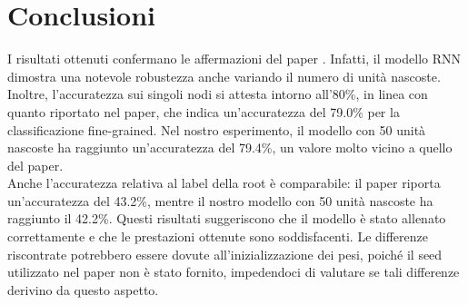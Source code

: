 \section{Conclusioni}

I risultati ottenuti confermano le affermazioni del paper
\cite{socher-etal-2013-recursive}. Infatti, il modello RNN dimostra una notevole
robustezza anche variando il numero di unità nascoste. Inoltre, l'accuratezza
sui singoli nodi si attesta intorno all'80\%, in linea con quanto riportato nel
paper, che indica un'accuratezza del 79.0\% per la classificazione fine-grained.
Nel nostro esperimento, il modello con 50 unità nascoste ha raggiunto
un'accuratezza del 79.4\%, un valore molto vicino a quello del paper.\\
Anche l'accuratezza relativa al label della root è comparabile: il paper riporta
un'accuratezza del 43.2\%, mentre il nostro modello con 50 unità nascoste ha
raggiunto il 42.2\%. Questi risultati suggeriscono che il modello è stato
allenato correttamente e che le prestazioni ottenute sono soddisfacenti. Le
differenze riscontrate potrebbero essere dovute all'inizializzazione dei pesi,
poiché il seed utilizzato nel paper non è stato fornito, impedendoci di valutare
se tali differenze derivino da questo aspetto.
